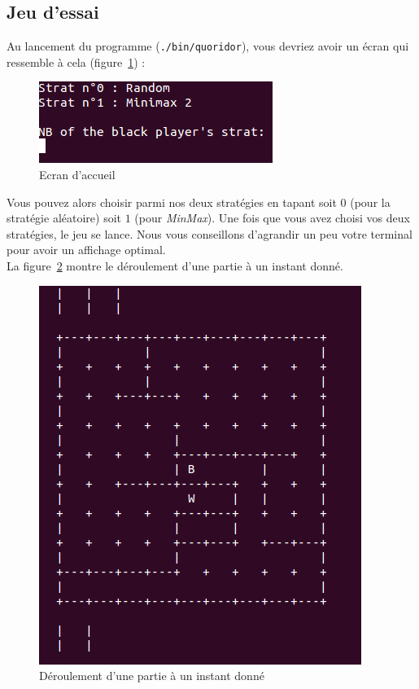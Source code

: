\documentclass[12pt,a4paper]{article}
\begin{document}
\subsection{Jeu d'essai}

Au lancement du programme (\verb,./bin/quoridor,), vous devriez avoir un écran qui ressemble à cela (figure~\ref{acc}) :

\begin{figure}[h]
  \begin{center}
    \includegraphics[scale=0.7]{acc}
    \caption{Ecran d'accueil}
    \label{acc}
  \end{center}
\end{figure}

Vous pouvez alors choisir parmi nos deux stratégies en tapant soit $0$ (pour la stratégie aléatoire) soit $1$ (pour \textit{MinMax}). Une fois que vous avez choisi vos deux stratégies, le jeu se lance. Nous vous conseillons d'agrandir un peu votre terminal pour avoir un affichage optimal. \\

La figure~\ref{jeu} montre le déroulement d'une partie à un instant donné.\\

\begin{figure}[h]
  \begin{center}
    \includegraphics[scale=0.7]{plateau}
    \caption{Déroulement d'une partie à un instant donné}
    \label{jeu}
  \end{center}
\end{figure}
\end{document}
